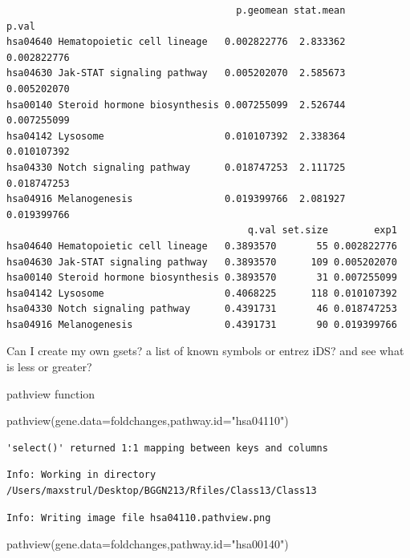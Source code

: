 \documentclass[
  letterpaper,
  DIV=11,
  numbers=noendperiod]{scrartcl}
\newenvironment{Shaded}{\begin{snugshade}}{\end{snugshade}}
\newcommand{\AttributeTok}[1]{\textcolor[rgb]{0.40,0.45,0.13}{#1}}
\newcommand{\FunctionTok}[1]{\textcolor[rgb]{0.28,0.35,0.67}{#1}}
\newcommand{\NormalTok}[1]{\textcolor[rgb]{0.00,0.23,0.31}{#1}}
\newcommand{\StringTok}[1]{\textcolor[rgb]{0.13,0.47,0.30}{#1}}
\begin{document}
\begin{verbatim}
                                        p.geomean stat.mean       p.val
hsa04640 Hematopoietic cell lineage   0.002822776  2.833362 0.002822776
hsa04630 Jak-STAT signaling pathway   0.005202070  2.585673 0.005202070
hsa00140 Steroid hormone biosynthesis 0.007255099  2.526744 0.007255099
hsa04142 Lysosome                     0.010107392  2.338364 0.010107392
hsa04330 Notch signaling pathway      0.018747253  2.111725 0.018747253
hsa04916 Melanogenesis                0.019399766  2.081927 0.019399766
                                          q.val set.size        exp1
hsa04640 Hematopoietic cell lineage   0.3893570       55 0.002822776
hsa04630 Jak-STAT signaling pathway   0.3893570      109 0.005202070
hsa00140 Steroid hormone biosynthesis 0.3893570       31 0.007255099
hsa04142 Lysosome                     0.4068225      118 0.010107392
hsa04330 Notch signaling pathway      0.4391731       46 0.018747253
hsa04916 Melanogenesis                0.4391731       90 0.019399766
\end{verbatim}

Can I create my own gsets? a list of known symbols or entrez iDS? and
see what is less or greater?

pathview function

\begin{Shaded}
\begin{Highlighting}[]
\FunctionTok{pathview}\NormalTok{(}\AttributeTok{gene.data=}\NormalTok{foldchanges,}\AttributeTok{pathway.id=}\StringTok{"hsa04110"}\NormalTok{)}
\end{Highlighting}
\end{Shaded}

\begin{verbatim}
'select()' returned 1:1 mapping between keys and columns
\end{verbatim}

\begin{verbatim}
Info: Working in directory /Users/maxstrul/Desktop/BGGN213/Rfiles/Class13/Class13
\end{verbatim}

\begin{verbatim}
Info: Writing image file hsa04110.pathview.png
\end{verbatim}

\begin{Shaded}
\begin{Highlighting}[]
\FunctionTok{pathview}\NormalTok{(}\AttributeTok{gene.data=}\NormalTok{foldchanges,}\AttributeTok{pathway.id=}\StringTok{"hsa00140"}\NormalTok{)}
\end{Highlighting}
\end{Shaded}
\end{document}
